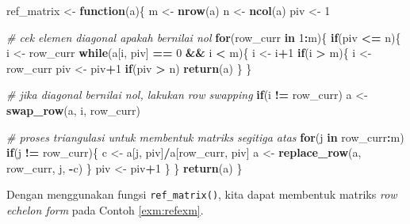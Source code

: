 \documentclass[]{book}
\newenvironment{Shaded}{\begin{snugshade}}{\end{snugshade}}
\newcommand{\CommentTok}[1]{\textcolor[rgb]{0.56,0.35,0.01}{\textit{#1}}}
\newcommand{\ControlFlowTok}[1]{\textcolor[rgb]{0.13,0.29,0.53}{\textbf{#1}}}
\newcommand{\DecValTok}[1]{\textcolor[rgb]{0.00,0.00,0.81}{#1}}
\newcommand{\KeywordTok}[1]{\textcolor[rgb]{0.13,0.29,0.53}{\textbf{#1}}}
\newcommand{\NormalTok}[1]{#1}
\newcommand{\OperatorTok}[1]{\textcolor[rgb]{0.81,0.36,0.00}{\textbf{#1}}}
\newcommand{\StringTok}[1]{\textcolor[rgb]{0.31,0.60,0.02}{#1}}
\theoremstyle{definition}
\theoremstyle{definition}
\theoremstyle{definition}
\theoremstyle{remark}
\begin{document}
\begin{Shaded}
\begin{Highlighting}[]
\NormalTok{ref_matrix <-}\StringTok{ }\ControlFlowTok{function}\NormalTok{(a)\{}
\NormalTok{  m <-}\StringTok{ }\KeywordTok{nrow}\NormalTok{(a)}
\NormalTok{  n <-}\StringTok{ }\KeywordTok{ncol}\NormalTok{(a)}
\NormalTok{  piv <-}\StringTok{ }\DecValTok{1}
  
\CommentTok{# cek elemen diagonal apakah bernilai nol}
  \ControlFlowTok{for}\NormalTok{(row_curr }\ControlFlowTok{in} \DecValTok{1}\OperatorTok{:}\NormalTok{m)\{}
    \ControlFlowTok{if}\NormalTok{(piv }\OperatorTok{<=}\StringTok{ }\NormalTok{n)\{}
\NormalTok{      i <-}\StringTok{ }\NormalTok{row_curr}
      \ControlFlowTok{while}\NormalTok{(a[i, piv] }\OperatorTok{==}\StringTok{ }\DecValTok{0} \OperatorTok{&&}\StringTok{ }\NormalTok{i }\OperatorTok{<}\StringTok{ }\NormalTok{m)\{}
\NormalTok{        i <-}\StringTok{ }\NormalTok{i}\OperatorTok{+}\DecValTok{1}
        \ControlFlowTok{if}\NormalTok{(i }\OperatorTok{>}\StringTok{ }\NormalTok{m)\{}
\NormalTok{          i <-}\StringTok{ }\NormalTok{row_curr}
\NormalTok{          piv <-}\StringTok{ }\NormalTok{piv}\OperatorTok{+}\DecValTok{1}
          \ControlFlowTok{if}\NormalTok{(piv }\OperatorTok{>}\StringTok{ }\NormalTok{n)}
            \KeywordTok{return}\NormalTok{(a)}
\NormalTok{        \}}
\NormalTok{      \}}
      
\CommentTok{# jika diagonal bernilai nol, lakukan row swapping}
    \ControlFlowTok{if}\NormalTok{(i }\OperatorTok{!=}\StringTok{ }\NormalTok{row_curr)}
\NormalTok{      a <-}\StringTok{ }\KeywordTok{swap_row}\NormalTok{(a, i, row_curr)}
    
\CommentTok{# proses triangulasi untuk membentuk matriks segitiga atas}
    \ControlFlowTok{for}\NormalTok{(j }\ControlFlowTok{in}\NormalTok{ row_curr}\OperatorTok{:}\NormalTok{m)}
      \ControlFlowTok{if}\NormalTok{(j }\OperatorTok{!=}\StringTok{ }\NormalTok{row_curr)\{}
\NormalTok{        c <-}\StringTok{ }\NormalTok{a[j, piv]}\OperatorTok{/}\NormalTok{a[row_curr, piv]}
\NormalTok{        a <-}\StringTok{ }\KeywordTok{replace_row}\NormalTok{(a, row_curr, j, }\OperatorTok{-}\NormalTok{c)}
\NormalTok{      \}}
\NormalTok{    piv <-}\StringTok{ }\NormalTok{piv}\OperatorTok{+}\DecValTok{1}
\NormalTok{    \}}
\NormalTok{  \}}
  \KeywordTok{return}\NormalTok{(a)}
\NormalTok{\}}
\end{Highlighting}
\end{Shaded}

Dengan menggunakan fungsi \texttt{ref\_matrix()}, kita dapat membentuk matriks \emph{row echelon form} pada Contoh \ref{exm:refexm}.
\end{document}
